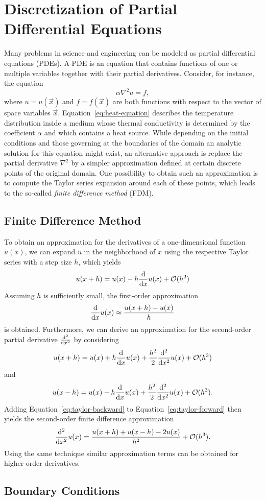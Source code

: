 \section{Discretization of Partial Differential Equations}
Many problems in science and engineering can be modeled as partial differential equations (PDEs). %
A PDE is an equation that contains functions of one or multiple variables together with their partial derivatives.
Consider, for instance, the equation
\begin{equation}
	\alpha \nabla^2 u = f,
	\label{eq:heat-equation}
\end{equation}
where $u = u(\vec{x})$ and $f = f(\vec{x})$ are both functions with respect to the vector of space variables $\vec{x}$.
Equation~\eqref{eq:heat-equation} describes the temperature distribution inside a medium whose thermal conductivity is determined by the coefficient $\alpha$ and which contains a heat source.
While depending on the initial conditions and those governing at the boundaries of the domain an analytic solution for this equation might exist, an alternative approach is replace the partial derivative $\nabla^2$ by a simpler approximation defined at certain discrete points of the original domain.
One possibility to obtain such an approximation is to compute the Taylor series expansion around each of these points, which leads to the so-called \emph{finite difference method} (FDM).
\subsection{Finite Difference Method}
To obtain an approximation for the derivatives of a one-dimensional function $u(x)$, we can expand $u$ in the neighborhood of $x$ using the respective Taylor series with a step size $h$, which yields
\begin{equation}
	u(x + h) = u(x) - h \dv{x} u(x) + \mathcal{O}(h^2)
\end{equation}
Assuming $h$ is sufficiently small, the first-order approximation 
\begin{equation}
	\dv{x} u(x) \approx \frac{u(x + h) -  u(x)}{h}
\end{equation}
is obtained.
Furthermore, we can derive an approximation for the second-order partial derivative $\dv[2]{x}$ by considering
\begin{equation}
	u(x + h) = u(x) + h \dv{x} u(x) + \frac{h^2}{2} \dv[2]{x} u(x) + \mathcal{O}(h^3)
	\label{eq:taylor-forward}
\end{equation}
and 
\begin{equation}
	u(x - h) = u(x) - h \dv{x} u(x) + \frac{h^2}{2} \dv[2]{x} u(x) + \mathcal{O}(h^3).
	\label{eq:taylor-backward}
\end{equation}
Adding Equation~\eqref{eq:taylor-backward} to Equation~\eqref{eq:taylor-forward} then yields the second-order finite difference approximation
\begin{equation}
	 \dv[2]{x} u(x) = \frac{u(x + h) + u(x - h) - 2u(x)}{h^2} + \mathcal{O}(h^3).
\end{equation}
Using the same technique similar approximation terms can be obtained for higher-order derivatives. %
\subsection{Boundary Conditions}




